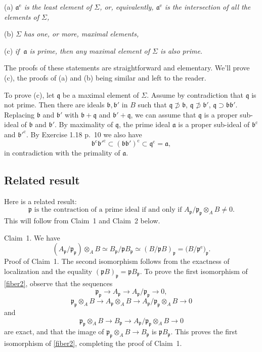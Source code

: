 \documentclass[parskip=half,fontsize=12pt]{scrartcl}%
\newcommand{\oo}{\operatorname}\newcommand{\ooo}{\operatorname*}
\newcommand{\mf}{\mathfrak}
\newcommand{\aaa}{\mf a}
\newcommand{\bbb}{\mf b}
\newcommand{\ppp}{\mf p}
\newcommand{\qqq}{\mf q}
\begin{document}
(a) \emph{$\aaa^{\oo e}$ is the least element of $\Sigma$, or, equivalently, $\aaa^{\oo e}$ is the intersection of all the elements of $\Sigma$,}

(b) \emph{$\Sigma$ has one, or more, maximal elements,}

(c) \emph{if $\ \aaa$ is prime, then any maximal element of $\Sigma$ is also prime.}

The proofs of these statements are straightforward and elementary. We'll prove (c), the proofs of (a) and (b) being similar and left to the reader.

To prove (c), let $\qqq$ be a maximal element of $\Sigma$. Assume by contradiction that $\qqq$ is not prime. Then there are ideals $\mf{b,b}'$ in $B$ such that $\qqq\not\supset\bbb$, $\qqq\not\supset\bbb'$, $\qqq\supset\mf{bb}'$. Replacing $\bbb$ and $\bbb'$ with $\bbb+\qqq$ and $\bbb'+\qqq$, we can assume that $\qqq$ is a proper sub-ideal of $\bbb$ and $\bbb'$. By maximality of $\qqq$, the prime ideal $\aaa$ is a proper sub-ideal of $\bbb^{\oo c}$ and $\bbb'^{\oo c}$. By Exercise 1.18 p.~10 we also have 
$$
\bbb^{\oo c}\bbb'^{\oo c}\subset(\mf{bb}')^{\oo c}\subset\qqq^{\oo c}=\aaa,
$$ 
in contradiction with the primality of $\aaa$.

\subsection{Related result}\label{res}%

Here is a related result:
\begin{equation}\label{fiber1}
\ppp\text{ is the contraction of a prime ideal if and only if }A_\ppp/\ppp_\ppp\otimes_AB\ne0.
\end{equation}
This will follow from Claim~1 and Claim~2 below.

Claim~1. We have 
\begin{equation}\label{fiber2}
(A_\ppp/\ppp_\ppp)\otimes_AB\simeq B_\ppp/\ppp B_\ppp\simeq(B/\ppp B)_\ppp=\big(B/\ppp^{\oo e}\big)_\ppp.%
\end{equation} 
Proof of Claim~1. The second isomorphism follows from the exactness of localization and the equality $(\ppp B)_\ppp=\ppp B_\ppp$. %
To prove the first isomorphism of \eqref{fiber2}, observe that the sequences 
$$
\ppp_\ppp\to A_\ppp\to A_\ppp/\ppp_\ppp\to0,
$$ 
$$
\ppp_\ppp\otimes_AB\to A_\ppp\otimes_AB\to A_\ppp/\ppp_\ppp\otimes_AB\to0
$$ 
and 
$$
\ppp_\ppp\otimes_AB\to B_\ppp\to A_\ppp/\ppp_\ppp\otimes_AB\to0
$$ 
are exact, and that the image of $\ppp_\ppp\otimes_AB\to B_\ppp$ is $\ppp B_\ppp$. This proves the first isomorphism of \eqref{fiber2}, completing the proof of Claim~1. 
\end{document}
